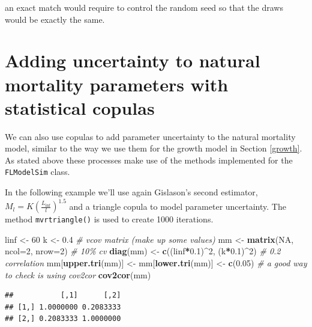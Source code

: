 \documentclass[
]{book}
\newenvironment{Shaded}{\begin{snugshade}}{\end{snugshade}}
\newcommand{\AttributeTok}[1]{\textcolor[rgb]{0.13,0.29,0.53}{#1}}
\newcommand{\CommentTok}[1]{\textcolor[rgb]{0.56,0.35,0.01}{\textit{#1}}}
\newcommand{\ConstantTok}[1]{\textcolor[rgb]{0.56,0.35,0.01}{#1}}
\newcommand{\DecValTok}[1]{\textcolor[rgb]{0.00,0.00,0.81}{#1}}
\newcommand{\FloatTok}[1]{\textcolor[rgb]{0.00,0.00,0.81}{#1}}
\newcommand{\FunctionTok}[1]{\textcolor[rgb]{0.13,0.29,0.53}{\textbf{#1}}}
\newcommand{\NormalTok}[1]{#1}
\newcommand{\OtherTok}[1]{\textcolor[rgb]{0.56,0.35,0.01}{#1}}
\newcommand{\SpecialCharTok}[1]{\textcolor[rgb]{0.81,0.36,0.00}{\textbf{#1}}}
\begin{document}
an exact match would require to control the random seed so that the draws would be exactly the same.

\hypertarget{adding-uncertainty-to-natural-mortality-parameters-with-statistical-copulas}{%
\section{Adding uncertainty to natural mortality parameters with statistical copulas}\label{adding-uncertainty-to-natural-mortality-parameters-with-statistical-copulas}}

We can also use copulas to add parameter uncertainty to the natural mortality model, similar to the way we use them for the growth model in Section \ref{growth}. As stated above these processes make use of the methods implemented for the \texttt{FLModelSim} class.

In the following example we'll use again Gislason's second estimator, \(M_l=K(\frac{L_{\inf}}{l})^{1.5}\) and a triangle copula to model parameter uncertainty. The method \texttt{mvrtriangle()} is used to create 1000 iterations.

\begin{Shaded}
\begin{Highlighting}[]
\NormalTok{linf }\OtherTok{\textless{}{-}} \DecValTok{60}
\NormalTok{k }\OtherTok{\textless{}{-}} \FloatTok{0.4}
\CommentTok{\# vcov matrix (make up some values)}
\NormalTok{mm }\OtherTok{\textless{}{-}} \FunctionTok{matrix}\NormalTok{(}\ConstantTok{NA}\NormalTok{, }\AttributeTok{ncol=}\DecValTok{2}\NormalTok{, }\AttributeTok{nrow=}\DecValTok{2}\NormalTok{)}
\CommentTok{\# 10\% cv}
\FunctionTok{diag}\NormalTok{(mm) }\OtherTok{\textless{}{-}} \FunctionTok{c}\NormalTok{((linf}\SpecialCharTok{*}\FloatTok{0.1}\NormalTok{)}\SpecialCharTok{\^{}}\DecValTok{2}\NormalTok{, (k}\SpecialCharTok{*}\FloatTok{0.1}\NormalTok{)}\SpecialCharTok{\^{}}\DecValTok{2}\NormalTok{)}
\CommentTok{\# 0.2 correlation}
\NormalTok{mm[}\FunctionTok{upper.tri}\NormalTok{(mm)] }\OtherTok{\textless{}{-}}\NormalTok{ mm[}\FunctionTok{lower.tri}\NormalTok{(mm)] }\OtherTok{\textless{}{-}} \FunctionTok{c}\NormalTok{(}\FloatTok{0.05}\NormalTok{)}
\CommentTok{\# a good way to check is using cov2cor}
\FunctionTok{cov2cor}\NormalTok{(mm)}
\end{Highlighting}
\end{Shaded}

\begin{verbatim}
##           [,1]      [,2]
## [1,] 1.0000000 0.2083333
## [2,] 0.2083333 1.0000000
\end{verbatim}
\end{document}

